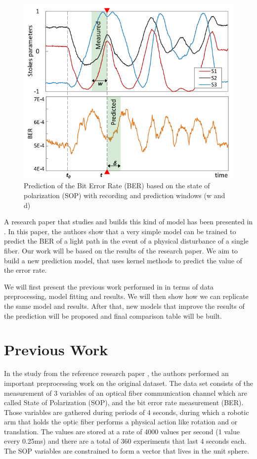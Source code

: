 \documentclass[a4paper]{article}
\begin{document}
\begin{figure}[H]
    \centering
    \includegraphics[width=0.6\linewidth]{img/previousWork_w_d.png}
    \caption{Prediction of the Bit Error Rate (BER) based on the state of polarization (SOP) with recording and prediction windows (w and d)}
    \label{previous}
\end{figure}

A research paper that studies and builds this kind of model has been presented in \cite{Benham}. In this paper, the authors show that a very simple model can be trained to predict the BER of a light path in the event of a physical disturbance of a single fiber. Our work will be based on the results of the research paper. We aim to build a new prediction model, that uses kernel methods to predict the value of the error rate.

We will first present the previous work performed in \cite{Benham} in terms of data preprocessing, model fitting and results. We will then show how we can replicate the same model and results. After that, new models that improve the results of the prediction will be proposed and final comparison table will be built.



\section{Previous Work}


In the study from the reference research paper \cite{Benham}, the authors performed an important preprocessing work on the original dataset. 
The data set consists of the measurement of 3 variables of an optical fiber communication channel which are called State of Polarization (SOP), and the bit error rate measurement (BER). Those variables are gathered during periods of 4 seconds, during which a robotic arm that holds the optic fiber performs a physical action like rotation and or translation. The values are stored at a rate of 4000 values per second (1 value every 0.25ms) and there are a total of 360 experiments that last 4 seconds each. The SOP variables are constrained to form a vector that lives in the unit sphere.
\end{document}
